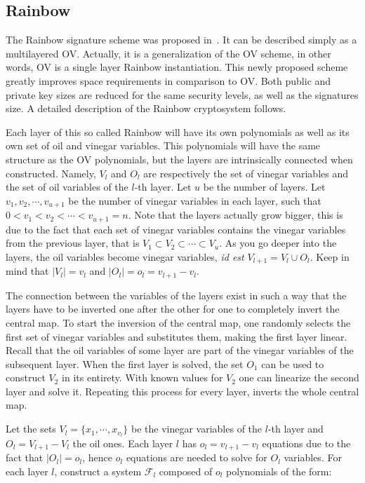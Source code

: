 \documentclass{ufsctex/ufsctex}
\begin{document}
\subsection{Rainbow}\label{sec:rainbow}

The Rainbow signature scheme was proposed in~\cite{ding2005rainbow}. It can be
described simply as a multilayered OV. Actually, it is a generalization of the
OV scheme, in other words, OV is a single layer Rainbow instantiation. This
newly proposed scheme greatly improves space requirements in comparison to OV.
Both public and private key sizes are reduced for the same security levels, as
well as the signatures size. A detailed description of the Rainbow cryptosystem
follows.

Each layer of this so called Rainbow will have its own polynomials as well as
its own set of oil and vinegar variables. This polynomials will have the same
structure as the OV polynomials, but the layers are intrinsically connected
when constructed. Namely, $V_l$ and $O_l$ are respectively the set of vinegar
variables and the set of oil variables of the $l$-th layer. Let $u$ be the
number of layers. Let $v_1, v_2, \cdots, v_{u+1}$ be the number of vinegar
variables in each layer, such that $0 < v_1 < v_2 < \cdots < v_{u+1} = n$. Note
that the layers actually grow bigger, this is due to the fact that each set of
vinegar variables contains the vinegar variables from the previous layer, that
is $V_1 \subset V_2 \subset \cdots \subset V_{u}$. As you go deeper into the
layers, the oil variables become vinegar variables, \textit{id est} $V_{l+1} =
V_l \cup O_l$. Keep in mind that $|V_l| = v_l$ and $|O_l| = o_l = v_{l+1} -
v_{l}$.

The connection between the variables of the layers exist in such a way that the
layers have to be inverted one after the other for one to completely invert the
central map. To start the inversion of the central map, one randomly selects
the first set of vinegar variables and substitutes them, making the first layer
linear. Recall that the oil variables of some layer are part of the vinegar
variables of the subsequent layer. When the first layer is solved, the set
$O_1$ can be used to construct $V_2$ in its entirety. With known values for
$V_2$ one can linearize the second layer and solve it. Repeating this process
for every layer, inverts the whole central map.

Let the sets $V_l = \{x_1, \cdots, x_{v_l}\}$ be the vinegar variables of the
$l$-th layer and $O_l = V_{l+1} - V_l$ the oil ones. Each layer $l$ has $o_l =
v_{l+1} - v_{l}$ equations due to the fact that $|O_l| = o_l$, hence $o_l$
equations are needed to solve for $O_l$ variables. For each layer $l$,
construct a system $\mathcal{F}_l$ composed of $o_l$ polynomials of the form:
\end{document}
